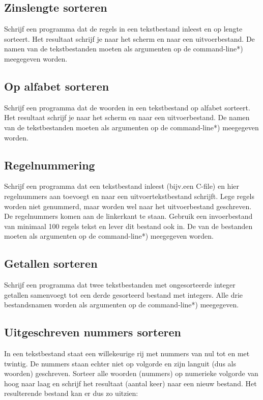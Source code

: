 \documentclass[a4paper,10pt,fleqn,twoside]{article}
\begin{document}
\subsection{Zinslengte sorteren}
Schrijf een programma dat de regels in een tekstbestand inleest en op lengte sorteert. Het resultaat schrijf je naar het scherm en naar een uitvoerbestand. De namen van de tekstbestanden moeten als argumenten op de command-line*) meegegeven worden.

\subsection{Op alfabet sorteren}
Schrijf een programma dat de woorden in een tekstbestand op alfabet sorteert. Het resultaat schrijf je naar het scherm en naar een uitvoerbestand. De namen van de tekstbestanden moeten als argumenten op de command-line*) meegegeven worden.

\subsection{Regelnummering}
Schrijf een programma dat een tekstbestand inleest (bijv.\@ een C-file) en hier regelnummers aan toevoegt en naar een uitvoertekstbestand schrijft. Lege regels worden niet genummerd, maar worden wel naar het uitvoerbestand geschreven. De regelnummers komen aan de linkerkant te staan. Gebruik een invoerbestand van minimaal 100 regels tekst en lever dit bestand ook in. De van de bestanden moeten als argumenten op de command-line*) meegegeven worden.

\subsection{Getallen sorteren }
Schrijf een programma dat twee tekstbestanden met ongesorteerde integer getallen samenvoegt tot een derde gesorteerd bestand met integers. Alle drie bestandsnamen worden als argumenten op de command-line*) meegegeven.

\subsection{Uitgeschreven nummers sorteren}
In een tekstbestand staat een willekeurige rij met nummers van nul tot en met twintig. De nummers staan echter niet op volgorde en zijn languit (dus als woorden) geschreven. Sorteer alle woorden (nummers) op numerieke volgorde van hoog naar laag en schrijf het resultaat (aantal keer) naar een nieuw bestand. Het resulterende bestand kan er dus zo uitzien:
\end{document}
